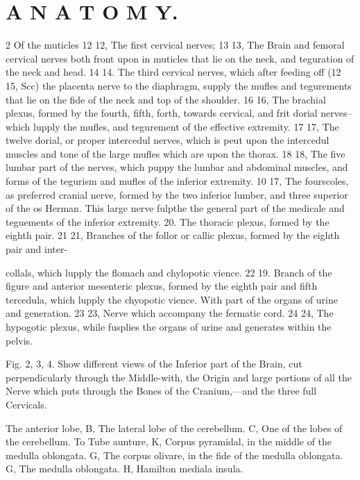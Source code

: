 \documentclass[10pt]{article}
\begin{document}
\section*{\centering A N A T O M Y.}
\begin{multicols}{2}\raggedcolumns
Of the muticles 12 12, The first cervical nerves; 13 13, The Brain and femoral cervical nerves both front upon in muticles that lie on the neck, and teguration of the neck and head. 14 14. The third cervical nerves, which after feeding off (12 15, Scc) the placenta nerve to the diaphragm, supply the mufles and tegurements that lie on the fide of the neck and top of the shoulder. 16 16, The brachial plexus, formed by the fourth, fifth, forth, towards cervical, and frit dorial nerves--which lupply the mufles, and tegurement of the effective extremity. 17 17, The twelve dorial, or proper intercedul nerves, which is peut upon the intercedul muscles and tone of the large mufles which are upon the thorax. 18 18, The five lumbar part of the nerves, which puppy the lumbar and abdominal muscles, and forms of the tegurism and mufles of the inferior extremity. 10 17, The fourscoles, as preferred cranial nerve, formed by the two inferior lumber, and three superior of the os Herman. This large nerve fulpthe the general part of the medicale and teguements of the inferior extremity. 20. The thoracic plexus, formed by the eighth pair. 21 21, Branches of the follor or callic plexus, formed by the eighth pair and inter-

collals, which lupply the flomach and chylopotic vience. 22 19. Branch of the figure and anterior mesenteric plexus, formed by the eighth pair and fifth tercedula, which lupply the chyopotic vience. With part of the organs of urine and generation. 23 23, Nerve which accompany the fermatic cord. 24 24, The hypogotic plexus, while fusplies the organs of urine and generates within the pelvis.

Fig. 2, 3, 4. Show different views of the Inferior part of the Brain, cut perpendicularly through the Middle-with, the Origin and large portions of all the Nerve which puts through the Bones of the Cranium,—and the three full Cervicals.

The anterior lobe, B, The lateral lobe of the cerebellum. C, One of the lobes of the cerebellum. To Tube aunture, K, Corpus pyramidal, in the middle of the medulla oblongata. G, The corpus olivare, in the fide of the medulla oblongata. G, The medulla oblongata. H, Hamilton mediala insula.


\end{multicols}
\end{document}
